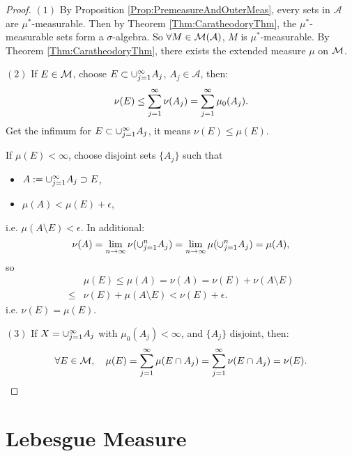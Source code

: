 \begin{proof}
    $(1)$ By Proposition \ref{Prop:PremeasureAndOuterMeas}, 
    every sets in $\mathcal{A}$ are $\mu^{*}$-measurable. Then by 
    Theorem \ref{Thm:CaratheodoryThm}, the $\mu^{*}$-measurable 
    sets form a $\sigma$-algebra. 
    So $\forall M\in\mathcal{M}(\mathcal{A})$, $M$ is $\mu^{*}$-measurable. 
    By Theorem \ref{Thm:CaratheodoryThm}, 
    there exists the extended measure $\mu$ on $\mathcal{M}$. 

    $(2)$ If $E\in\mathcal{M}$, choose $E\subset\cup_{j=1}^{\infty}A_{j}$, 
    $A_{j}\in\mathcal{A}$, then:
    \begin{displaymath}
        \nu(E)\le\sum_{j=1}^{\infty}\nu(A_{j})
        =\sum_{j=1}^{\infty}\mu_{0}(A_j).
    \end{displaymath}
    Get the infimum for $E\subset\cup_{j=1}^{\infty}A_j$, it means 
    $\nu(E)\le\mu(E)$. 

    If $\mu(E)<\infty$, choose disjoint sets $\{A_{j}\}$ such that 
    \begin{itemize}
        \item $A:=\cup_{j=1}^{\infty}A_j\supset E$,
        \item $\mu(A)<\mu(E)+\epsilon$,
    \end{itemize}
    i.e. $\mu(A\setminus E)<\epsilon$. In additional:
    \begin{displaymath}
        \nu(A)=\lim_{n\rightarrow\infty}\nu(\cup_{j=1}^{n}A_j)
        =\lim_{n\rightarrow\infty}\mu(\cup_{j=1}^{n}A_j)=\mu(A),
    \end{displaymath}
    so 
    \begin{displaymath}
        \begin{array}{rl}
        &\mu(E)\le\mu(A)=\nu(A)=\nu(E)+\nu(A\setminus E)\\
        \le&\nu(E)+\mu(A\setminus E)<\nu(E)+\epsilon.
        \end{array}
    \end{displaymath}
    i.e. $\nu(E)=\mu(E)$.

    $(3)$ If $X=\cup_{j=1}^{\infty}A_{j}$ with $\mu_{0}(A_j)<\infty$, 
    and $\{A_j\}$ disjoint, 
    then:
    \begin{displaymath}
        \forall E\in\mathcal{M},\quad \mu(E)=\sum_{j=1}^{\infty}\mu(E\cap A_j)
        =\sum_{j=1}^{\infty}\nu(E\cap A_j)=\nu(E).
    \end{displaymath}
\end{proof}
\section{Lebesgue Measure}
